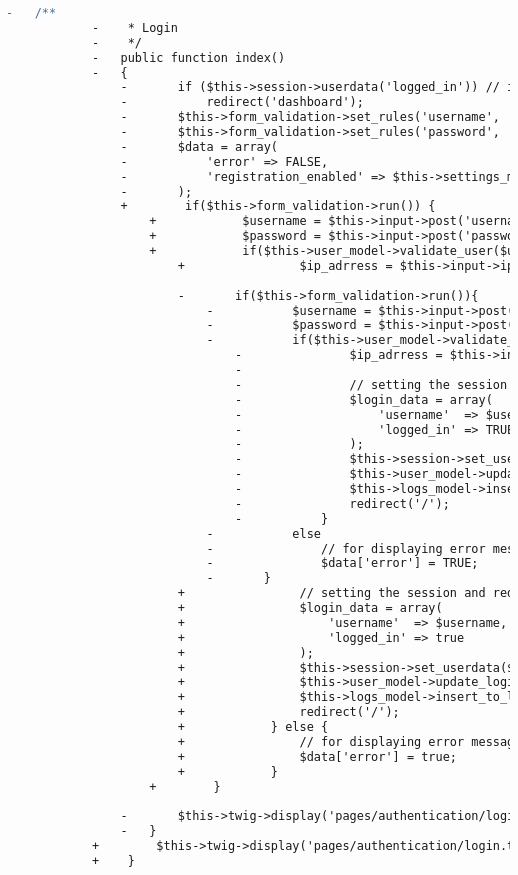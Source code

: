 \begin{lstlisting}[language=diff, caption=Perubahan pada kode Login.php]
			-	/**
			-	 * Login
			-	 */
			-	public function index()
			-	{
				-		if ($this->session->userdata('logged_in')) // if logged in
				-			redirect('dashboard');
				-		$this->form_validation->set_rules('username', 'Username', 'required|min_length[3]|max_length[20]|alpha_numeric|lowercase');
				-		$this->form_validation->set_rules('password', 'Password', 'required|min_length[6]|max_length[200]');
				-		$data = array(
				-			'error' => FALSE,
				-			'registration_enabled' => $this->settings_model->get_setting('enable_registration'),
				-		);
				+        if($this->form_validation->run()) {
					+            $username = $this->input->post('username');
					+            $password = $this->input->post('password');
					+            if($this->user_model->validate_user($username, $password)) {
						+                $ip_adrress = $this->input->ip_address();
						
						-		if($this->form_validation->run()){
							-			$username = $this->input->post('username');
							-			$password = $this->input->post('password');
							-			if($this->user_model->validate_user($username, $password)){
								-				$ip_adrress = $this->input->ip_address();
								-			
								-				// setting the session and redirecting to dashboard:
								-				$login_data = array(
								-					'username'  => $username,
								-					'logged_in' => TRUE
								-				);
								-				$this->session->set_userdata($login_data);
								-				$this->user_model->update_login_time($username);
								-				$this->logs_model->insert_to_logs($username,$ip_adrress);
								-				redirect('/');
								-			}
							-			else
							-				// for displaying error message in 'pages/authentication/login' view
							-				$data['error'] = TRUE;
							-		}
						+                // setting the session and redirecting to dashboard:
						+                $login_data = array(
						+                    'username'  => $username,
						+                    'logged_in' => true
						+                );
						+                $this->session->set_userdata($login_data);
						+                $this->user_model->update_login_time($username);
						+                $this->logs_model->insert_to_logs($username, $ip_adrress);
						+                redirect('/');
						+            } else {
						+                // for displaying error message in 'pages/authentication/login' view
						+                $data['error'] = true;
						+            }
					+        }
				
				-		$this->twig->display('pages/authentication/login.twig', $data);
				-	}
			+        $this->twig->display('pages/authentication/login.twig', $data);
			+    }
		

\end{lstlisting}
